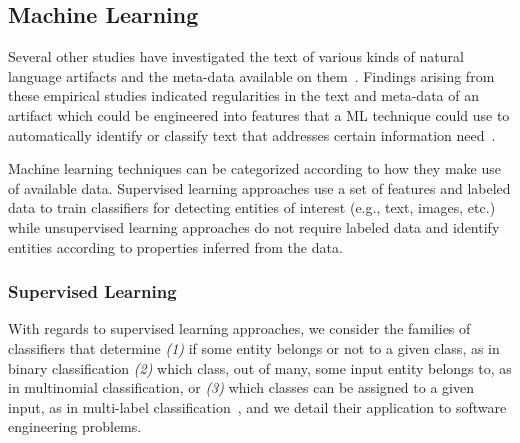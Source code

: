 \subsection{Machine Learning }
\label{cp2:machine-learning}



Several other studies have investigated the text 
of various kinds of natural language artifacts and 
the meta-data available on them~\cite{Ko2006, Maalej2013, Arya2019}.
Findings arising from these empirical studies
indicated regularities in the text and meta-data of 
an artifact which could be engineered into 
features that a  \acf{ML} technique could use to automatically identify or classify
text that addresses certain information need~\cite{Bavota2016}. 



Machine learning techniques can be categorized 
according to how they make use of available data. 
Supervised learning approaches use a set of features and labeled data
to train classifiers for detecting entities of interest (e.g., text, images, etc.)
while unsupervised learning approaches do not require labeled data and 
identify entities according to properties inferred from the data.



\subsubsection{Supervised Learning }
\label{cp2:supervised}


With regards to supervised learning approaches, 
we consider the families of classifiers that 
determine
\textit{(1)} if some entity belongs or not to a given class, as in binary classification
\textit{(2)} which class, out of many, some input entity belongs to, as in multinomial classification, or
\textit{(3)} which classes can be assigned to a given input, as in multi-label classification~\cite{alpaydin2020ml},
 and we detail their application to software engineering problems.






